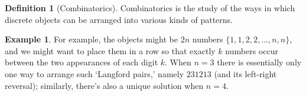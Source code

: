 \documentclass[11pt]{book}
\theoremstyle{definition}
\newtheorem{definition}{Definition}
\newtheorem{example}{Example}
\theoremstyle{plain}
\theoremstyle{problemstyle}
\theoremstyle{remark}
\theoremstyle{definition}
\begin{document}
\begin{definition}[Combinatorics]
    Combinatorics is the study of the ways in which discrete objects can be arranged into various kinds of patterns. 

\end{definition}
\begin{example}
    For example, the objects might be $2n$ numbers $\{1,1,2,2,\dots,n,n\}$, and we might want to place them in a row so that exactly $k$ numbers occur between the two appearances of each digit $k$. When $n=3$ there is essentially only one way to arrange such `Langford pairs,' namely $231213$ (and its left-right reversal); similarly, there's also a unique solution when $n=4$. 
\end{example}










\printbibliography
\end{document}
